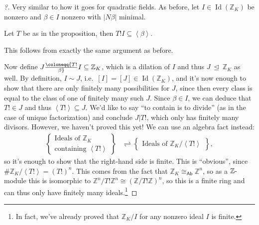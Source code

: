 \begin{proof}[?]

Very similar to how it goes for quadratic fields. As before, let
\(I \in \operatorname{Id}({\mathbb{Z}}_K)\) be nonzero and
\(\beta \in I\) nonzero with \({\left\lvert {N \beta} \right\rvert}\)
minimal.

\begin{claim}

Let \(T\) be as in the proposition, then
\(T! I \subseteq \left\langle{ \beta }\right\rangle\).

\end{claim}

This follows from exactly the same argument as before.

Now define \(J \coloneqq{T! \over \beta} I \subseteq {\mathbb{Z}}_K\),
which is a dilation of \(I\) and thus
\(J {~\trianglelefteq~}{\mathbb{Z}}_K\) as well. By definition,
\(I\sim J\), i.e.~\([I] = [J] \in \operatorname{Id}({\mathbb{Z}}_K)\),
and it's now enough to show that there are only finitely many
possibilities for \(J\), since then every class is equal to the class of
one of finitely many such \(J\). Since \(\beta\in I\), we can deduce
that \(T! \in J\) and thus
\(\left\langle{ T! }\right\rangle \subseteq J\). We'd like to say ``to
contain is to divide'' (as in the case of unique factorization) and
conclude \(J\mathrel{\Big|}T!\), which only has finitely many divisors.
However, we haven't proved this yet! We can use an algebra fact instead:
\begin{align*}
\left\{{\substack{
  \text{Ideals of ${\mathbb{Z}}_K$ }
  \\
  \text{containing } \left\langle{ T! }\right\rangle 
}}\right\}
&\rightleftharpoons
\left\{{\substack{
  \text{Ideals of } {\mathbb{Z}}_K / \left\langle{ T! }\right\rangle 
}}\right\}
,\end{align*}
so it's enough to show that the right-hand side is finite. This is
``obvious'', since
\(\# {\mathbb{Z}}_K / \left\langle{ T! }\right\rangle = (T!)^n\). This
comes from the fact that
\({\mathbb{Z}}_K \cong_{{\mathsf{Ab}}} {\mathbb{Z}}^n\), so as a
\({\mathbb{Z}}{\hbox{-}}\)module this is isomorphic to
\({\mathbb{Z}}^n / T! {\mathbb{Z}}^n \cong ({\mathbb{Z}}/T! {\mathbb{Z}})^n\),
so this is a finite ring and can thus only have finitely many
ideals.\footnote{In fact, we've already proved that
  \({\mathbb{Z}}_K / I\) for any nonzero ideal \(I\) is finite.}

\end{proof}

